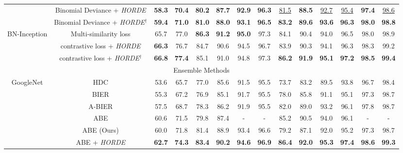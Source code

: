\documentclass[10pt,twocolumn,letterpaper]{article}
\def\ourmethod{\textit{HORDE}}
\begin{document}
\begin{table*}[t!]
\begin{center}
\begin{tabular}{|c|c|cccccc|cccccc|}
                 & Binomial Deviance + \ourmethod & \textbf{58.3} &\textbf{ 70.4} & \textbf{80.2 }& \textbf{87.7} & \textbf{92.9} & \textbf{96.3} & \underline{81.5} & \textbf{88.5} & \underline{92.7} & \underline{95.4} & \textbf{97.4} & \underline{98.6} \\
                 & Binomial Deviance + \ourmethod{$^\dag$} & \textbf{59.4} &\textbf{ 71.0} & \textbf{81.0 }& \textbf{88.0} & \textbf{93.1} & \textbf{96.5} & \textbf{83.2} & \textbf{89.6} & \textbf{93.6} & \textbf{96.3} & \textbf{98.0} & \textbf{98.8} \\
                \hline
                \multirow{3}{*}{BN-Inception} & Multi-similarity loss \cite{Wang_2019_CVPR} & 65.7 & 77.0 & \textbf{86.3} & \textbf{91.2} & \textbf{95.0} & 97.3 & 84.1 & 90.4 &94.0 & 96.5 & 98.0 & 98.9 \\
                \cline{2-14}
                 & contrastive loss + \ourmethod & \textbf{66.3} & 76.7 & 84.7 & 90.6 & 94.5 & 96.7 & 83.9 & 90.3 & 94.1 & 96.3 & 98.3 & 99.2 \\
                 & contrastive loss + \ourmethod{$^\dag$} & \textbf{66.8} & \textbf{77.4} & 85.1 & 91.0 & 94.8 & 97.3 & \textbf{86.2} & \textbf{91.9} & \textbf{95.1} & \textbf{97.2} & \textbf{98.5} & \textbf{99.4} \\
                \hline
                \multicolumn{14}{|c|}{Ensemble Methods} \\\hline
                \multirow{7}{*}{GoogleNet} & HDC \cite{Yuan_2017_ICCV} & 53.6 & 65.7 & 77.0 & 85.6 & 91.5 & 95.5 & 73.7 & 83.2 & 89.5 & 93.8 & 96.7 & 98.4 \\
                 & BIER \cite{Opitz_2017_ICCV} & 55.3 & 67.2 & 76.9 & 85.1 & 91.7 & 95.5 & 78.0 & 85.8 & 91.1 & 95.1 & 97.3 & 98.7 \\
                 & A-BIER \cite{Opitz_toap_PAMI} & 57.5 & 68.7 & 78.3 & 86.2 & 91.9 & 95.5 & 82.0 & 89.0 & 93.2 & 96.1 & 97.8 & 98.7 \\
                 & ABE \cite{Kim_2018_ECCV} & 60.6 & 71.5 & 79.8 & 87.4 & - & - & 85.2 & 90.5 & 94.0 & 96.1 & - & - \\
                \cline{2-14}
                 & ABE (Ours) & 60.0 & 71.8 & 81.4 & 88.9 & 93.4 & 96.6 & 79.2 & 87.1 & 92.0 & 95.2 & 97.3 & 98.7 \\
                 & ABE + \ourmethod & \textbf{62.7} & \textbf{74.3} &\textbf{ 83.4} & \textbf{90.2} & \textbf{94.6} & \textbf{96.9} & \textbf{86.4} & \textbf{92.0 }& \textbf{95.3} & \textbf{97.4} &\textbf{ 98.6} & \textbf{99.3} \\

\end{tabular}
\end{center}
\end{table*}
\end{document}
